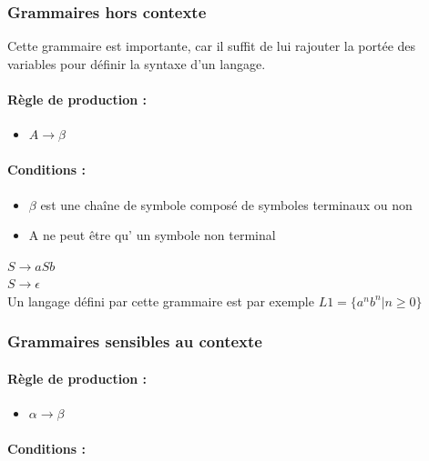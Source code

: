 \subsubsection{Grammaires hors contexte}

Cette grammaire est importante, car il suffit de lui rajouter la portée des 
variables pour définir la syntaxe d'un langage.

\paragraph{Règle de production :} 
\begin{itemize}
	\item $A \rightarrow \beta$
\end{itemize}

\paragraph{Conditions :}

\begin{itemize}
	\item  $\beta$ est une chaîne de symbole composé de symboles terminaux
	       	ou non
	\item A ne peut être qu’ un symbole non terminal
\end{itemize}

\begin{myexem}
	$S \rightarrow aSb$ \\
	$S \rightarrow \epsilon$ \\
	Un langage défini par cette grammaire est par exemple $L1 = \{a^nb^n|n 
		\geq 0\}$
\end{myexem}

\subsubsection{Grammaires sensibles au contexte}

\paragraph{Règle de production :} 
\begin{itemize}
	\item $\alpha \rightarrow \beta$
\end{itemize}

\paragraph{Conditions :}


